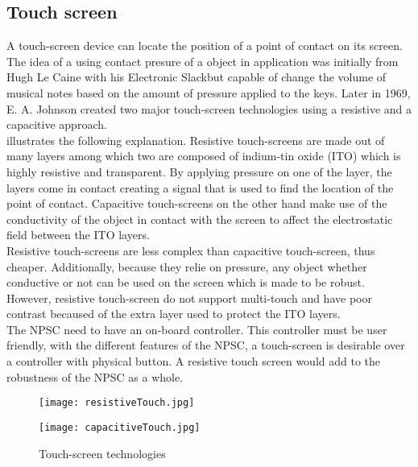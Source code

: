 \subsection{Touch screen}
A touch-screen device can locate the position of a point of contact on its screen. The idea of a using  contact presure of a object in application was initially from Hugh Le Caine with his Electronic Slackbut capable of change the volume of musical notes based on the amount of pressure applied to the keys. Later in 1969, E. A. Johnson created two major touch-screen technologies using a resistive and a capacitive approach. \\
 illustrates the following explanation. Resistive touch-screens are made out of many layers among which two are composed of indium-tin oxide (ITO) which is highly resistive and transparent. By applying pressure on one of the layer, the layers come in contact creating a signal that is used to find the location of the point of contact. Capacitive touch-screens on the other hand make use of the conductivity of the object in contact with the screen to affect the electrostatic field between the ITO layers. \\
Resistive touch-screens are less complex than capacitive touch-screen, thus cheaper. Additionally, because they relie on pressure, any object whether conductive or not can be used on the screen which is made to be robust. However, resistive touch-screen do not support multi-touch and have poor contrast becaused of the extra layer used to protect the ITO layers.\\
The NPSC need to have an on-board controller. This controller must be user friendly, with the different features of the NPSC, a touch-screen is desirable over a controller with physical button. A resistive touch screen would add to the robustness of the NPSC as a whole.   
\begin{figure}[h!]
\centering
\begin{minipage}[b]{0.45\textwidth}
\texttt{[image: resistiveTouch.jpg]}
\label{fig:resistive_screen}
\end{minipage}
\begin{minipage}[b]{0.45\textwidth}
\texttt{[image: capacitiveTouch.jpg]}
\label{fig:capacitive_screen}
\end{minipage}
\caption{Touch-screen technologies}
\label{fig:screen}
\end{figure}    

